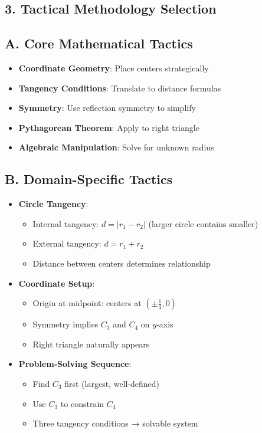\documentclass[11pt]{article}
\begin{document}
\begin{tacticalbox}
\section*{3. Tactical Methodology Selection}

\subsection*{A. Core Mathematical Tactics}
\begin{itemize}[leftmargin=*]
    \item \textbf{Coordinate Geometry}: Place centers strategically
    \item \textbf{Tangency Conditions}: Translate to distance formulas
    \item \textbf{Symmetry}: Use reflection symmetry to simplify
    \item \textbf{Pythagorean Theorem}: Apply to right triangle
    \item \textbf{Algebraic Manipulation}: Solve for unknown radius
\end{itemize}

\subsection*{B. Domain-Specific Tactics}
\begin{itemize}[leftmargin=*]
    \item \textbf{Circle Tangency}:
    \begin{itemize}
        \item Internal tangency: $d = |r_1 - r_2|$ (larger circle contains smaller)
        \item External tangency: $d = r_1 + r_2$
        \item Distance between centers determines relationship
    \end{itemize}
    \item \textbf{Coordinate Setup}:
    \begin{itemize}
        \item Origin at midpoint: centers at $(\pm\frac{1}{4}, 0)$
        \item Symmetry implies $C_3$ and $C_4$ on $y$-axis
        \item Right triangle naturally appears
    \end{itemize}
    \item \textbf{Problem-Solving Sequence}:
    \begin{itemize}
        \item Find $C_3$ first (largest, well-defined)
        \item Use $C_3$ to constrain $C_4$
        \item Three tangency conditions → solvable system
    \end{itemize}
\end{itemize}


\end{tacticalbox}
\end{document}
